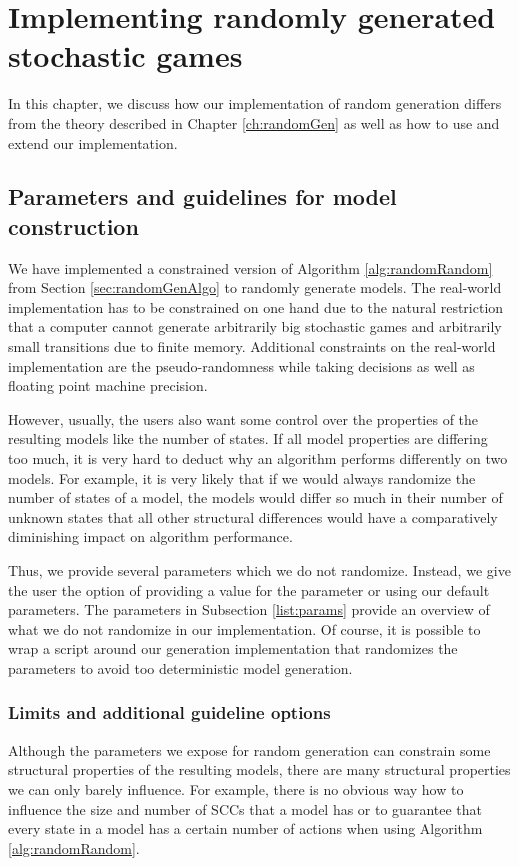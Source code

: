 \chapter{Implementing randomly generated stochastic games} \label{ch:implementedRandomGen}
In this chapter, we discuss how our implementation of random generation differs from the theory described in Chapter \ref{ch:randomGen} as well as how to use and extend our implementation. 

\section{Parameters and guidelines for model construction} \label{sec:guidelines}
We have implemented a constrained version of Algorithm \ref{alg:randomRandom} from Section \ref{sec:randomGenAlgo} to randomly generate models.
The real-world implementation has to be constrained on one hand due to the natural restriction that a computer cannot generate arbitrarily big stochastic games and 
arbitrarily small transitions due to finite memory. Additional constraints on the real-world implementation are the pseudo-randomness while taking decisions as well as
floating point machine precision.

However, usually, the users also want some control over the properties of the resulting models like the number of states.
If all model properties are differing too much, it is very hard to deduct why an algorithm performs differently on two models.
For example, it is very likely that if we would always randomize the number of states of a model, the models would differ so much in their number of unknown states that all other structural differences 
would have a comparatively diminishing impact on algorithm performance.

Thus, we provide several parameters which we do not randomize. Instead, we give the user the option of providing a value for the parameter or using our default parameters.
The parameters in Subsection \ref{list:params} provide an overview of what we do not randomize in our implementation.
Of course, it is possible to wrap a script around our generation implementation that randomizes the parameters to avoid too deterministic model generation.

\subsection*{Limits and additional guideline options} \label{sec:guidelinesSubsec}
Although the parameters we expose for random generation can constrain some structural properties of the resulting models, 
there are many structural properties we can only barely influence. For example, there is no obvious way how to influence the size and number of SCCs that a model has or to guarantee
that every state in a model has a certain number of actions when using Algorithm \ref{alg:randomRandom}.

